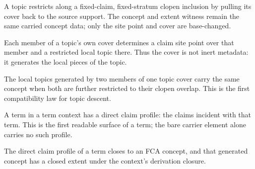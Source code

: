 \begin{theorem}\label{thm:claim-topic-restrict-cover}\leanok{}
A topic restricts along a fixed-claim, fixed-stratum clopen inclusion by pulling
its cover back to the source support.  The concept and extent witness remain the
same carried concept data; only the site point and cover are base-changed.
\end{theorem}

\begin{theorem}\label{thm:claim-topic-cover-restriction}\leanok{}
Each member of a topic's own cover determines a claim site point over that
member and a restricted local topic there.  Thus the cover is not inert
metadata: it generates the local pieces of the topic.
\end{theorem}

\begin{theorem}\label{thm:claim-topic-cover-overlap-concepts}\leanok{}
The local topics generated by two members of one topic cover carry the same
concept when both are further restricted to their clopen overlap.  This is the
first compatibility law for topic descent.
\end{theorem}

\begin{proposition}\label{thm:claim-term-profile}\leanok{}
A term in a term context has a direct claim profile: the claims incident with
that term.  This is the first readable surface of a term; the bare carrier
element alone carries no such profile.
\end{proposition}

\begin{theorem}\label{thm:claim-term-generated-concept}\leanok{}
The direct claim profile of a term closes to an FCA concept, and that generated
concept has a closed extent under the context's derivation closure.
\end{theorem}

